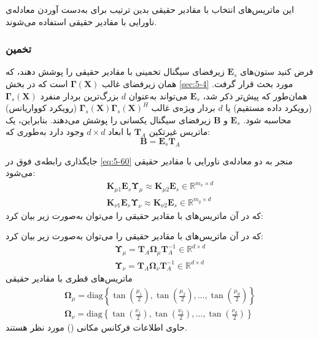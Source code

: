 این ماتریس‌های انتخاب با مقادیر حقیقی بدین ترتیب برای به‌دست آوردن معادله‌ی ناورایی با مقادیر حقیقی استفاده می‌شوند.

\subsubsection{تخمین }
\label{subsec:5-5-2-3}
فرض کنید ستون‌های $\bm{E}_s$ زیرفضای سیگنال تخمینی با مقادیر حقیقی را پوشش دهند، که همان زیرفضای غالب $\bm{\Gamma}(\bm{X})$ است که در بخش \ref{sec:5-4} مورد بحث قرار گرفت. همان‌طور که پیش‌تر ذکر شد، $\bm{E}_s$ می‌تواند به‌عنوان $d$ بزرگ‌ترین بردار منفرد $\bm{\Gamma}_s(\bm{X})$ (رویکرد داده مستقیم) یا $d$ بردار ویژه‌ی غالب $\bm{\Gamma}_s(\bm{X})\bm{\Gamma}_s(\bm{X})^H$ (رویکرد کوواریانس) محاسبه شود. $\bm{E}_s$ و $\bm{B}$ زیرفضای سیگنال یکسانی را پوشش می‌دهند. بنابراین، یک ماتریس غیرتکین $\bm{T}_A$ با ابعاد $d \times d$ وجود دارد به‌طوری که:
\begin{equation}
	\bm{B} = \bm{E}_s \bm{T}_A
	\label{eq:5-62}
\end{equation}

جایگذاری رابطه‌ی فوق در \eqref{eq:5-60} منجر به دو معادله‌ی ناورایی با مقادیر حقیقی می‌شود:
\begin{subequations}
	\begin{gather}
		\bm{K}_{\mu 1} \bm{E}_s \bm{\Upsilon}_{\mu} \approx \bm{K}_{\mu 2} \bm{E}_s \in \mathbb{R}^{m_x \times d} \label{eq:5-63a} \\
		\bm{K}_{\nu 1} \bm{E}_s \bm{\Upsilon}_{\nu} \approx \bm{K}_{\nu 2} \bm{E}_s \in \mathbb{R}^{m_y \times d} \label{eq:5-63b}
	\end{gather}
	\label{eq:5-63}
\end{subequations}
که در آن ماتریس‌های با مقادیر حقیقی را می‌توان به‌صورت زیر بیان کرد:

که در آن ماتریس‌های با مقادیر حقیقی را می‌توان به‌صورت زیر بیان کرد:
\begin{subequations}
	\begin{gather}
		\bm{\Upsilon}_{\mu} = \bm{T}_A \bm{\Omega}_{\mu} \bm{T}_A^{-1} \in \mathbb{R}^{d \times d} \label{eq:5-64a} \\
		\bm{\Upsilon}_{\nu} = \bm{T}_A \bm{\Omega}_{\nu} \bm{T}_A^{-1} \in \mathbb{R}^{d \times d} \label{eq:5-64b}
	\end{gather}
	\label{eq:5-64}
\end{subequations}
ماتریس‌های قطری با مقادیر حقیقی
\begin{subequations}
	\begin{gather}
		\bm{\Omega}_{\mu} = \text{diag} \left\{ \tan \left( \frac{\mu_1}{2} \right), \tan \left( \frac{\mu_2}{2} \right), \dots, \tan \left( \frac{\mu_d}{2} \right) \right\} \label{eq:5-65a} \\
		\bm{\Omega}_{\nu} = \text{diag} \left\{ \tan \left( \frac{\nu_1}{2} \right), \tan \left( \frac{\nu_2}{2} \right), \dots, \tan \left( \frac{\nu_d}{2} \right) \right\} \label{eq:5-65b}
	\end{gather}
	\label{eq:5-65}
\end{subequations}
حاوی اطلاعات فرکانس مکانی () مورد نظر هستند.

